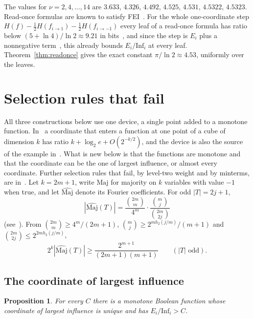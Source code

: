 \documentclass[11pt]{amsart}
\newtheorem{proposition}[theorem]{Proposition}
\theoremstyle{definition}
\theoremstyle{remark}
\newcommand{\Inf}{\mathrm{Inf}}
\begin{document}
The values for $\nu=2,4,\dots,14$ are $3.633$, $4.326$, $4.492$, $4.525$, $4.531$, $4.5322$, $4.5323$.
Read-once formulas are known to satisfy FEI~\cite{CKLS,OT13}. For the whole one-coordinate step
$H(f)-\frac12H(f_{i\to1})-\frac12H(f_{i\to-1})$ every leaf of a read-once formula has ratio below
$(5+\ln4)/\ln2\approx9.21$ in bits~\cite{Shm1}, and since the step is $E_i$ plus a nonnegative
term~\cite[Lemma~2]{Shm2}, this already bounds $E_i/\Inf_i$ at every leaf. Theorem~\ref{thm:readonce} gives the exact
constant $\pi/\ln2\approx4.53$, uniformly over the leaves.

\section{Selection rules that fail}\label{sec:neg}

All three constructions below use one device, a single point added to a monotone function. In~\cite[Proposition~7]{Shm2}
a coordinate that enters a function at one point of a cube of dimension $k$ has ratio $k+\log_2e+O(2^{-k/2})$, and
the device is also the source of the example in~\cite[Proposition~5.1]{GMP}. What is new below is that the functions
are monotone and that the coordinate can be the one of largest influence, or almost every coordinate. Further
selection rules that fail, by level-two weight and by minterms, are in~\cite{ShmHid}. Let $k=2m+1$, write $\mathrm{Maj}$ for majority on $k$ variables with value
$-1$ when true, and let $\hat{\mathrm{Maj}}$ denote its Fourier coefficients. For odd $|T|=2j+1$,
\[
|\hat{\mathrm{Maj}}(T)|=\frac{\binom{2m}{m}}{4^m}\cdot\frac{\binom mj}{\binom{2m}{2j}}
\]
(see~\cite[Section~5.3]{ODo}). From $\binom{2m}m\ge4^m/(2m+1)$, $\binom mj\ge2^{mh_2(j/m)}/(m+1)$ and
$\binom{2m}{2j}\le2^{2mh_2(j/m)}$,
\begin{equation}\label{eq:majlow}
2^k|\hat{\mathrm{Maj}}(T)|\ge\frac{2^{m+1}}{(2m+1)(m+1)}\qquad(|T|\text{ odd}).
\end{equation}

\subsection{The coordinate of largest influence}

\begin{proposition}\label{prop:maxinf}
For every $C$ there is a monotone Boolean function whose coordinate of largest influence is unique and has
$E_i/\Inf_i>C$.
\end{proposition}
\end{document}
